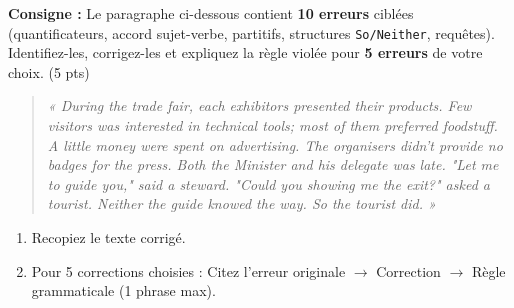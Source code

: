 \documentclass[11pt]{article}
\begin{document}
\begin{exercice}
\textbf{Consigne :} Le paragraphe ci-dessous contient \textbf{10 erreurs} ciblées (quantificateurs, accord sujet-verbe, partitifs, structures \texttt{So/Neither}, requêtes). Identifiez-les, corrigez-les et expliquez la règle violée pour \textbf{5 erreurs} de votre choix. (5 pts)

\begin{quote}
\textit{« During the trade fair, each exhibitors presented their products. Few visitors was interested in technical tools; most of them preferred foodstuff. A little money were spent on advertising. The organisers didn't provide no badges for the press. Both the Minister and his delegate was late. "Let me to guide you," said a steward. "Could you showing me the exit?" asked a tourist. Neither the guide knowed the way. So the tourist did. »}
\end{quote}

\begin{enumerate}
    \item Recopiez le texte corrigé.
    \item Pour 5 corrections choisies : Citez l'erreur originale $\rightarrow$ Correction $\rightarrow$ Règle grammaticale (1 phrase max).
\end{enumerate}
\end{exercice}
\end{document}
